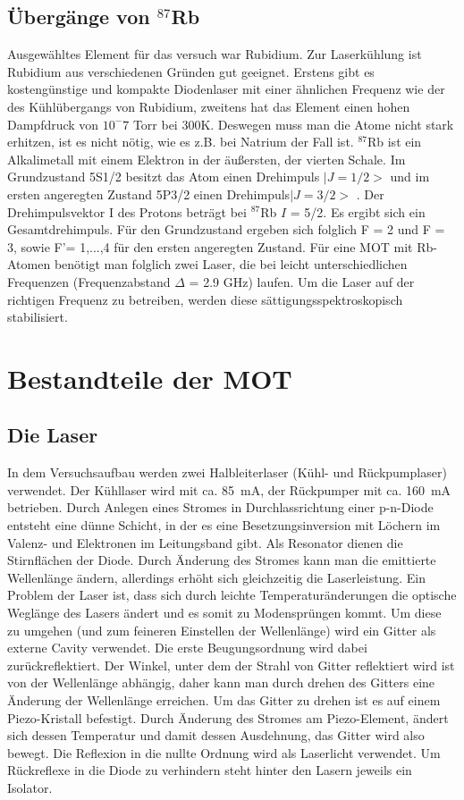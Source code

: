 \documentclass[12pt,a4paper]{article}
\begin{document}
  \subsection{Übergänge von ${}^{87}$Rb}
  Ausgewähltes Element für das versuch war Rubidium. Zur Laserkühlung ist Rubidium aus verschiedenen Gründen gut geeignet. Erstens gibt es kostengünstige und kompakte Diodenlaser mit einer ähnlichen Frequenz wie der des Kühlübergangs von Rubidium, zweitens hat das Element einen hohen Dampfdruck von ${10^-7}$ Torr bei 300K. Deswegen muss man die Atome nicht stark erhitzen, ist es nicht nötig, wie es z.B. bei Natrium der Fall ist.
${}^{87}$Rb ist ein Alkalimetall mit einem Elektron in der äußersten, der vierten Schale. Im Grundzustand 5S1/2 besitzt das Atom einen Drehimpuls
   ${|J = 1/2>}$ und im ersten angeregten Zustand 5P3/2 einen Drehimpuls${ |J = 3/2>}$ . Der Drehimpulsvektor I des Protons beträgt bei ${}^{87}$Rb $I$ = 5/2. Es ergibt sich ein Gesamtdrehimpuls. Für den Grundzustand ergeben sich folglich F = 2 und F = 3, sowie F'= 1,...,4 für den ersten angeregten Zustand.
Für eine MOT mit Rb-Atomen benötigt man folglich zwei Laser, die bei leicht unterschiedlichen Frequenzen (Frequenzabstand ${\Delta}$ = 2.9 GHz) laufen. Um die Laser auf der richtigen Frequenz zu betreiben, werden diese sättigungsspektroskopisch stabilisiert.
\section{Bestandteile der MOT}
  \subsection{Die Laser}
    In dem Versuchsaufbau werden zwei Halbleiterlaser (Kühl- und Rückpumplaser)
    verwendet. Der Kühllaser wird mit ca. \SI{85}{\mA}, der Rückpumper mit ca.
    \SI{160}{\mA} betrieben. Durch Anlegen eines Stromes in Durchlassrichtung
    einer p-n-Diode entsteht eine dünne Schicht, in der es eine Besetzungsinversion
    mit Löchern im Valenz- und Elektronen im Leitungsband gibt. Als Resonator
    dienen die Stirnflächen der Diode. Durch Änderung des Stromes kann man die
    emittierte Wellenlänge ändern, allerdings erhöht sich gleichzeitig die
    Laserleistung. Ein Problem der Laser ist, dass sich durch leichte
    Temperaturänderungen die optische Weglänge des Lasers ändert und es somit zu
    Modensprüngen kommt. Um diese zu umgehen (und zum feineren Einstellen der
    Wellenlänge) wird ein Gitter als externe Cavity verwendet. Die erste
    Beugungsordnung wird dabei zurückreflektiert. Der Winkel, unter dem der Strahl
    von Gitter reflektiert wird ist von der Wellenlänge abhängig, daher kann man
    durch drehen des Gitters eine Änderung der Wellenlänge erreichen. Um das Gitter
    zu drehen ist es auf einem Piezo-Kristall befestigt. Durch Änderung des Stromes
    am Piezo-Element, ändert sich dessen Temperatur und damit dessen Ausdehnung, das
    Gitter wird also bewegt. Die Reflexion in die nullte Ordnung wird als Laserlicht
    verwendet. Um Rückreflexe in die Diode zu verhindern steht hinter den Lasern
    jeweils ein Isolator.
\end{document}
